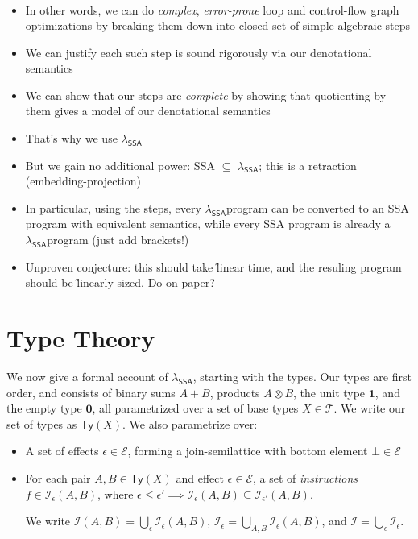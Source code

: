 \documentclass[acmsmall,screen,review]{acmart}
\newcommand{\mc}[1]{\ensuremath{\mathcal{#1}}}
\newcommand{\mb}[1]{\ensuremath{\mathbf{#1}}}
\newcommand{\ms}[1]{\ensuremath{\mathsf{#1}}}
\newcommand{\isotopessa}{\(\lambda_{\ms{SSA}}\)}
\begin{document}
\begin{align*}
\end{align*}

\begin{itemize}
  \item In other words, we can do \textit{complex}, \textit{error-prone} loop and control-flow graph
        optimizations by breaking them down into closed set of simple algebraic steps
  \item We can justify each such step is sound rigorously via our denotational semantics
  \item We can show that our steps are \textit{complete} by showing that quotienting by them gives
        a model of our denotational semantics
  \item That's why we use \isotopessa
  \item But we gain no additional power: SSA $\subseteq$ \isotopessa; this is a retraction
  (embedding-projection)
  \item In particular, using the steps, every \isotopessa program can be converted to an SSA program with
        equivalent semantics, while every SSA program is already a \isotopessa program (just add brackets!)
  \item Unproven conjecture: this should take \~linear time, and the resuling program should be
  \~linearly sized. Do on paper?
\end{itemize}

\section{Type Theory}

We now give a formal account of \isotopessa, starting with the types. Our types are first order, and
consists of binary sums $A + B$, products $A \otimes B$, the unit type $\mathbf{1}$, and the empty
type $\mb{0}$, all parametrized over a set of base types $X \in \mc{T}$. We write our set of types
as $\ms{Ty}(X)$. We also parametrize over:
\begin{itemize}
  
  \item A set of effects $\epsilon \in \mc{E}$, forming a join-semilattice with bottom element $\bot
  \in \mc{E}$
  
  \item For each pair $A, B \in \ms{Ty}(X)$ and effect $\epsilon \in \mc{E}$, a set of
  \textit{instructions} $f \in \mc{I}_\epsilon(A, B)$, where $\epsilon \leq \epsilon' \implies
  \mc{I}_\epsilon(A, B) \subseteq \mc{I}_{\epsilon'}(A, B)$. 
  
  We write $\mc{I}(A, B) = \bigcup_\epsilon\mc{I}_\epsilon(A, B)$, $\mc{I}_\epsilon = \bigcup_{A,
  B}\mc{I}_\epsilon(A, B)$, and $\mc{I} = \bigcup_\epsilon\mc{I}_\epsilon$.

\end{itemize}
\end{document}
